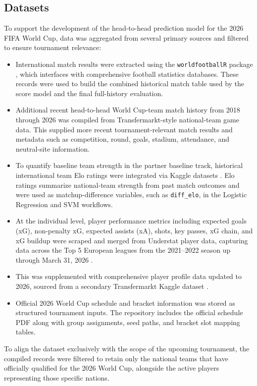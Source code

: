 \documentclass[11pt]{article}
\begin{document}
\subsection{Datasets}

To support the development of the head-to-head prediction model for the 2026 FIFA World Cup, data was aggregated from several primary sources and filtered to ensure tournament relevance:
\begin{itemize}

\item International match results were extracted using the \texttt{worldfootballR} package \cite{zivkovic_worldfootballR}, which interfaces with comprehensive football statistics databases. These records were used to build the combined historical match table used by the score model and the final full-history evaluation.

\item Additional recent head-to-head World Cup-team match history from 2018 through 2026 was compiled from Transfermarkt-style national-team game data. This supplied more recent tournament-relevant match results and metadata such as competition, round, goals, stadium, attendance, and neutral-site information.

\item To quantify baseline team strength in the partner baseline track, historical international team Elo ratings were integrated via Kaggle datasets \cite{alnimri_elo_ratings}. Elo ratings summarize national-team strength from past match outcomes and were used as matchup-difference variables, such as \texttt{diff\_elo}, in the Logistic Regression and SVM workflows.

\item At the individual level, player performance metrics including expected goals (xG), non-penalty xG, expected assists (xA), shots, key passes, xG chain, and xG buildup were scraped and merged from Understat player data, capturing data across the Top 5 European leagues from the 2021--2022 season up through March 31, 2026 \cite{fbref_top5_data}. 

\item This was supplemented with comprehensive player profile data updated to 2026, sourced from a secondary Transfermarkt Kaggle dataset \cite{cariboo_transfermarkt}. 

\item Official 2026 World Cup schedule and bracket information was stored as structured tournament inputs. The repository includes the official schedule PDF along with group assignments, seed paths, and bracket slot mapping tables.

\end{itemize}
To align the dataset exclusively with the scope of the upcoming tournament, the compiled records were filtered to retain only the national teams that have officially qualified for the 2026 World Cup, alongside the active players representing those specific nations.
\end{document}
